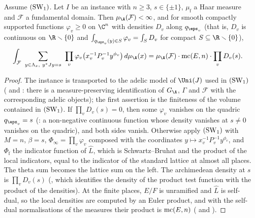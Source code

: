 \begin{lemma}\label{pf:rows:siegelcc}
Assume $(\mathrm{SW}_1)$. Let $I$ be an instance with $n\ge3$, $s\in\{\pm1\}$, $\mu_{\mathrm f}$ a Haar measure
and $\mathcal F$ a fundamental domain. Then $\mu_{\A}(\mathcal F)<\infty$, and for smooth compactly supported functions
$\varphi_v\ge0$ on $\C^n$ with densities $D_v$ along $q_{\eps_v}$ (that is, $D_v$ is continuous on $\R\smallsetminus\{0\}$
and $\int_{q_{\eps_v}(y)\in S}\varphi_v=\int_SD_v$ for compact $S\subseteq\R\smallsetminus\{0\}$),
\[
\int_{\mathcal F}\ \sum_{y\in\rowsLv_x,\ y^*Jy=s}\ \prod_v\varphi_v\bigl(x_v^{-1}P_v^{-1}y^{\phi_v}\bigr)\,d\mu_{\A}(x)
=\mu_{\A}(\mathcal F)\cdot\rowsmc(E,n)\cdot\prod_vD_v(s).
\]
\end{lemma}

\begin{proof}
The instance is transported to the adelic model of $\Uni(J)$ used in $(\mathrm{SW}_1)$
( and :
there is a measure-preserving identification of $\rowsGA$, $\Gamma$ and $\mathcal F$ with the corresponding adelic objects);
the first assertion is the finiteness of the volume contained in $(\mathrm{SW}_1)$. If $\prod_vD_v(s)=0$, then some
$\varphi_v$ vanishes on the quadric $q_{\eps_v}=s$ (: a
non-negative continuous function whose density vanishes at $s\ne0$ vanishes on the quadric), and both sides vanish.
Otherwise apply $(\mathrm{SW}_1)$ with $M=n$, $\beta=s$, $\Phi_\infty=\prod_v\varphi_v$ composed with the
coordinates $y\mapsto x_v^{-1}P_v^{-1}y^{\phi_v}$, and $\Phi_{\mathrm f}$ the indicator function of $\hat L$, which is
Schwartz--Bruhat and the product of the local indicators, equal to the indicator of the standard lattice at almost all
places. The theta sum becomes the lattice sum on the left. The archimedean density at $s$ is $\prod_vD_v(s)$
(, which identifies the density of the
product test function with the product of the densities). At the finite places, $E/F$ is unramified and $\hat L$ is
self-dual, so the local densities are computed by an Euler product, and with the self-dual normalisations of the
measures their product is $\operatorname{mc}(E,n)$
( and ).
\end{proof}

